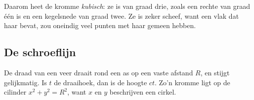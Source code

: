 Daarom heet de kromme \textit{kubisch}: ze is van graad drie, zoals een rechte van graad één is en een kegelsnede van graad twee. Ze is zeker scheef, want een vlak dat haar bevat, zou oneindig veel punten met haar gemeen hebben.


\begin{oefeningen}
\end{oefeningen}

\subsection{De schroeflijn}

De draad van een veer draait rond een as op een vaste afstand $R$, en stijgt gelijkmatig. Is $t$ de draaihoek, dan is de hoogte $ct$. Zo'n kromme ligt op de cilinder $x^2 + y^2 = R^2$, want $x$ en $y$ beschrijven een cirkel.


